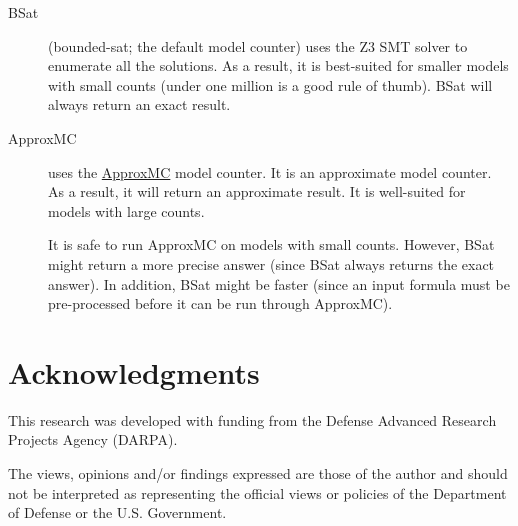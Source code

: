 \documentclass[11pt]{article}
\begin{document}
\begin{description}
    \item[BSat] (bounded-sat; the default model counter) uses the Z3 SMT solver to enumerate all the solutions. As a result, it is best-suited for smaller models with small counts (under one million is a good rule of thumb). BSat will always return an exact result.
    \item[ApproxMC] uses the \href{https://github.com/meelgroup/approxmc}{ApproxMC} model counter. It is an approximate model counter. As a result, it will return an approximate result. It is well-suited for models with large counts.
    
    It is safe to run ApproxMC on models with small counts. However, BSat might return a more precise answer (since BSat always returns the exact answer). In addition, BSat might be faster (since an input formula must be pre-processed before it can be run through ApproxMC).
\end{description}

\section{Acknowledgments}
This research was developed with funding from the Defense Advanced Research Projects Agency (DARPA).

The views, opinions and/or findings expressed are those of the author and should not be interpreted as representing the official views or policies of the Department of Defense or the U.S. Government.
\end{document}
